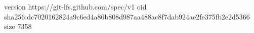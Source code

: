 version https://git-lfs.github.com/spec/v1
oid sha256:dc7020162824a9c6ed4a86b808d987aa488ac8f7dab924ae2fe375fb2e2d5366
size 7358
